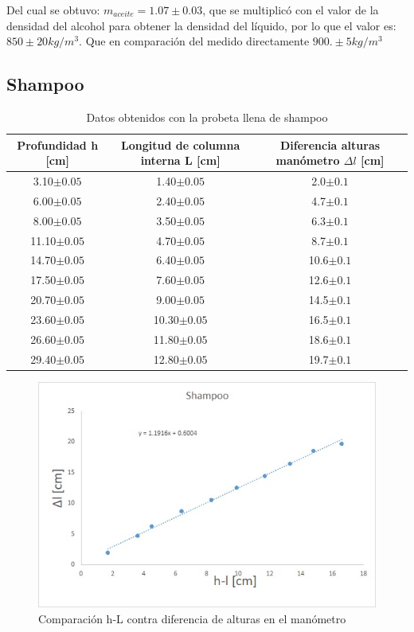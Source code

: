 \documentclass[a4paper]{article}
\begin{document}
Del cual se obtuvo: $m_{aceite}=1.07\pm0.03$, que se multiplicó con el valor de la densidad del alcohol para obtener la densidad del líquido, por lo que el valor es: $850 \pm 20 kg/m^3$. Que en comparación del medido directamente $900. \pm 5 kg/m^3$


\subsection*{Shampoo}

\begin{table}[H]
  \centering
    \begin{tabular}{|c|c|c|} \hline
    Profundidad \textbf{h} [cm] & Longitud de columna interna \textbf{L} [cm] & Diferencia alturas manómetro \textbf{$\Delta l$} [cm] \\ \hline
    3.10$\pm0.05$  & 1.40$\pm0.05$  & 2.0$\pm0.1$ \\ \hline
    6.00$\pm0.05$  & 2.40$\pm0.05$  & 4.7$\pm0.1$ \\ \hline
    8.00$\pm0.05$  & 3.50$\pm0.05$  & 6.3$\pm0.1$ \\ \hline
    11.10$\pm0.05$ & 4.70$\pm0.05$  & 8.7$\pm0.1$ \\ \hline
    14.70$\pm0.05$ & 6.40$\pm0.05$  & 10.6$\pm0.1$ \\ \hline
    17.50$\pm0.05$ & 7.60$\pm0.05$  & 12.6$\pm0.1$ \\ \hline
    20.70$\pm0.05$ & 9.00$\pm0.05$  & 14.5$\pm0.1$ \\ \hline
    23.60$\pm0.05$ & 10.30$\pm0.05$ & 16.5$\pm0.1$ \\ \hline
    26.60$\pm0.05$ & 11.80$\pm0.05$ & 18.6$\pm0.1$ \\ \hline
    29.40$\pm0.05$ & 12.80$\pm0.05$ & 19.7$\pm0.1$ \\ \hline
    \end{tabular}%
    \caption{Datos obtenidos con la probeta llena de shampoo}
\end{table}%


\begin{figure}[H]
    \centering
    \includegraphics[width=12cm]{GRF-Sh.jpg}
    \caption{Comparación h-L contra diferencia de alturas en el manómetro}
\end{figure}
\end{document}
